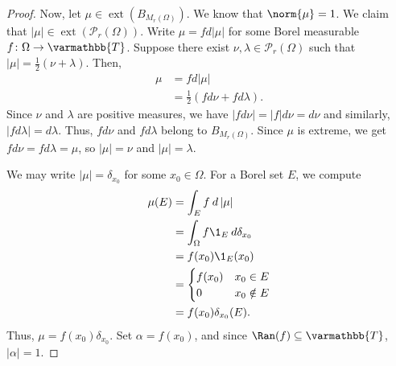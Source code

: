 \documentclass[10pt]{mypackage}
\renewcommand*{\mathbb}[1]{\varmathbb{#1}}
\begin{document}
\begin{proof}
  Now, let $\mu\in \operatorname{ext}\left(B_{M_{r}(\Omega)}\right)$. We know that $\norm{\mu} = 1$. We claim that $\left\vert \mu \right\vert\in \operatorname{ext}\left(\mathcal{P}_{r}(\Omega)\right)$. Write $\mu = f d\left\vert \mu \right\vert$ for some Borel measurable $f\colon \Omega\rightarrow \mathbb{T}$. Suppose there exist $\nu,\lambda\in \mathcal{P}_{r}\left(\Omega\right)$ such that $\left\vert \mu \right\vert = \frac{1}{2}\left(\nu + \lambda\right)$. Then,
  \begin{align*}
    \mu &= fd\left\vert \mu \right\vert\\
        &= \frac{1}{2}\left(fd\nu + fd\lambda\right).
  \end{align*}
  Since $\nu$ and $\lambda$ are positive measures, we have $\left\vert fd\nu \right\vert = \left\vert f \right\vert d\nu = d\nu$ and similarly, $\left\vert fd\lambda \right\vert = d\lambda$. Thus, $fd\nu$ and $fd\lambda$ belong to $B_{M_{r}(\Omega)}$. Since $\mu$ is extreme, we get $fd\nu = fd\lambda = \mu$, so $\left\vert \mu \right\vert = \nu$ and $\left\vert \mu \right\vert = \lambda$.\newline

  We may write $\left\vert \mu \right\vert = \delta_{x_{0}}$ for some $x_0\in \Omega$. For a Borel set $E$, we compute
  \begin{align*}
    \mu(E) &= \int_{E}^{} f\:d\left\vert \mu \right\vert\\
           &= \int_{\Omega}^{} f\1_{E}\:d\delta_{x_0}\\
           &= f(x_0)\1_{E}(x_0)\\
           &= \begin{cases}
             f(x_0) & x_0\in E\\
             0 & x_0\notin E
           \end{cases}\\
           &= f(x_0)\delta_{x_0}(E).
  \end{align*}
  Thus, $\mu = f\left(x_0\right)\delta_{x_0}$. Set $\alpha = f\left(x_0\right)$, and since $\Ran(f)\subseteq \mathbb{T}$, $\left\vert \alpha \right\vert = 1$.
\end{proof}
\end{document}
